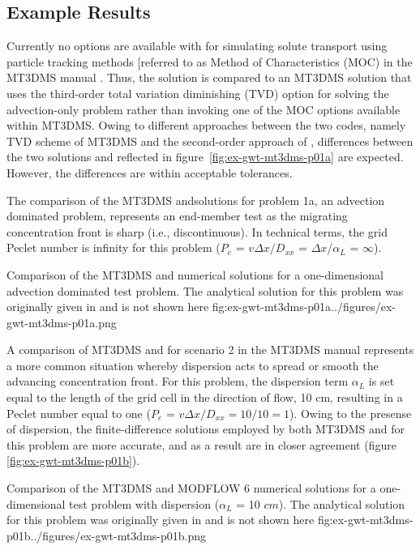 \subsection{Example Results}

Currently no options are available with \mf for simulating solute transport using particle tracking methods [referred to as Method of Characteristics (MOC) in the MT3DMS manual \cite{zheng1999mt3dms}.  Thus, the \mf solution is compared to an MT3DMS solution that uses the third-order total variation diminishing (TVD) option for solving the advection-only problem rather than invoking one of the MOC options available within MT3DMS.  Owing to different approaches between the two codes, namely TVD scheme of  MT3DMS and the second-order approach of \mf, differences between the two solutions and reflected in figure~\ref{fig:ex-gwt-mt3dms-p01a} are expected.  However, the differences are within acceptable tolerances.

The comparison of the MT3DMS and\mf solutions for problem 1a, an advection dominated problem, represents an end-member test as the migrating concentration front is sharp (i.e., discontinuous). In technical terms, the grid Peclet number is infinity for this problem ($P_e$ = $v\Delta x/D_{xx}$ = $\Delta x$/$\alpha_L$ = $\infty$).

\begin{StandardFigure}
	{Comparison of the MT3DMS and \mf numerical solutions for a one-dimensional advection dominated test problem.  The analytical solution for this problem was originally given in \cite{vanGenuchtenAlves1982} and is not shown here}
	{fig:ex-gwt-mt3dms-p01a}{../figures/ex-gwt-mt3dms-p01a.png}
\end{StandardFigure}

A comparison of MT3DMS and \mf for scenario 2 in the MT3DMS manual represents a more common situation whereby dispersion acts to spread or smooth the advancing concentration front.  For this problem, the dispersion term $\alpha_L$ is set equal to the length of the grid cell in the direction of flow, 10 cm, resulting in a Peclet number equal to one ($P_e$ = $v\Delta x/D_{xx} = 10/10 = 1$).  Owing to the presense of dispersion, the finite-difference solutions employed by both MT3DMS and \mf for this problem are more accurate, and as a result are in closer agreement (figure \ref{fig:ex-gwt-mt3dms-p01b}).

\begin{StandardFigure}
	{Comparison of the MT3DMS and MODFLOW 6 numerical solutions for a one-dimensional test problem with dispersion ($\alpha_L$ = 10 $cm$).  The analytical solution for this problem was originally given in \cite{vanGenuchtenAlves1982} and is not shown here}
	{fig:ex-gwt-mt3dms-p01b}{../figures/ex-gwt-mt3dms-p01b.png}
\end{StandardFigure}

